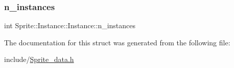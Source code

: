\subsubsection{\texorpdfstring{n\+\_\+instances}{n\_instances}}
{\footnotesize\ttfamily int Sprite\+::\+Instance\+::\+Instance\+::n\+\_\+instances}



The documentation for this struct was generated from the following file\+:\begin{DoxyCompactItemize}
\item 
include/\mbox{\hyperlink{_sprite__data_8h}{Sprite\+\_\+data.\+h}}\end{DoxyCompactItemize}
